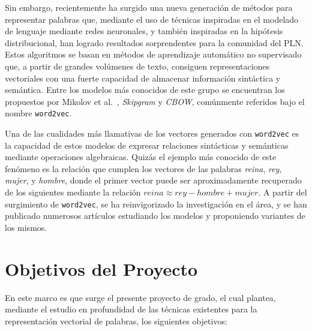 Sin embargo, recientemente ha surgido una nueva generación de métodos para representar palabras
que, mediante el uso de técnicas inspiradas en el modelado de lenguaje mediante redes neuronales, y
también inspiradas en la hipótesis distribucional, han logrado resultados sorprendentes para la
comunidad del PLN\@. Estos algoritmos se basan en métodos de aprendizaje automático no supervisado
que, a partir de grandes volúmenes de texto, consiguen representaciones vectoriales con una fuerte
capacidad de almacenar información sintáctica y semántica. Entre los modelos más conocidos de este
grupo se encuentran los propuestos por Mikolov et al.~\cite{Mikolov2013a, Mikolov2013b,
Mikolov2013c}, \textit{Skipgram} y \textit{CBOW}, comúnmente referidos bajo el nombre
\texttt{word2vec}.

Una de las cualidades más llamativas de los vectores generados con \texttt{word2vec} es la capacidad
de estos modelos de expresar relaciones sintácticas y semánticas mediante operaciones
algebraicas. Quizás el ejemplo más conocido de este fenómeno es la relación que cumplen los vectores
de las palabras \textit{reina}, \textit{rey}, \textit{mujer}, y \textit{hombre}, donde el primer
vector puede ser aproximadamente recuperado de los siguientes mediante la relación $reina \approx
rey - hombre + mujer$. A partir del surgimiento de \texttt{word2vec}, se ha reinvigorizado la
investigación en el área, y se han publicado numerosos artículos estudiando los modelos y
proponiendo variantes de los mismos.


\section{Objetivos del Proyecto}

En este marco es que surge el presente proyecto de grado, el cual plantea, mediante el estudio en
profundidad de las técnicas existentes para la representación vectorial de palabras, los siguientes
objetivos:

